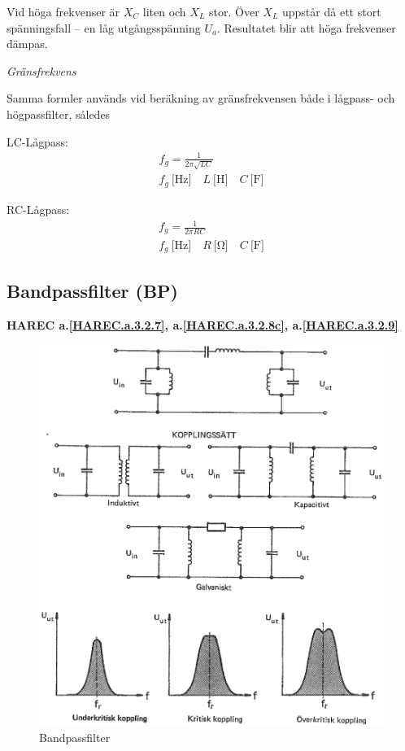 Vid höga frekvenser är \(X_C\) liten och \(X_L\) stor. Över \(X_L\) uppstår då
ett stort spänningsfall -- en låg utgångsspänning \(U_a\). Resultatet blir att
höga frekvenser dämpas.

\emph{Gränsfrekvens}

Samma formler används vid beräkning av gränsfrekvensen både i lågpass- och
högpassfilter, således

LC-Lågpass:
\begin{gather*}
  f_g = \frac{1}{2π\sqrt{LC}} \\
  f_g\ \text{[Hz]} \quad L\ \text{[H]} \quad C\ \text{[F]}
\end{gather*}

RC-Lågpass:
\begin{gather*}
  f_g = \frac{1}{2π{RC}} \\
  f_g\ \text{[Hz]} \quad R\ \text{[Ω]} \quad C\ \text{[F]}
\end{gather*}

\subsection{Bandpassfilter (BP)}
\textbf{HAREC
  a.\ref{HAREC.a.3.2.7}\label{myHAREC.a.3.2.7},
  a.\ref{HAREC.a.3.2.8c}\label{myHAREC.a.3.2.8c},
  a.\ref{HAREC.a.3.2.9}\label{myHAREC.a.3.2.9c}
}

\begin{figure}
\includegraphics[width=\textwidth]{images/bild_2_3-24.png}
\caption{Bandpassfilter}
\label{fig:BildII3-24}
\end{figure}

